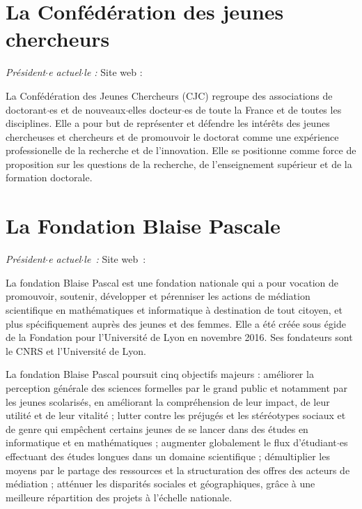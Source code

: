\section{La Conf\'ed\'eration des jeunes chercheurs}
\emph{Pr\'esident$\cdot$e actuel$\cdot$le : } \hfill Site web : 

\smallskip


La Conf\'ed\'eration des Jeunes Chercheurs (CJC) regroupe des associations
de doctorant$\cdot$es et de nouveaux$\cdot$elles docteur$\cdot$es de toute la France et de toutes
les disciplines. Elle a pour but de repr\'esenter et d\'efendre les int\'er\^ets
des jeunes chercheuses et chercheurs et de promouvoir le doctorat comme une exp\'erience
professionelle de la recherche et de l'innovation. Elle se positionne
comme force de proposition sur les questions de la recherche, de
l'enseignement sup\'erieur et de la formation doctorale.


\section{La Fondation Blaise Pascale}

\emph{Pr\'esident$\cdot$e actuel$\cdot$le~: } \hfill Site web~: 
\smallskip

La fondation Blaise Pascal est une fondation nationale qui a pour vocation de promouvoir, soutenir, d\'evelopper et p\'erenniser les actions de m\'ediation scientifique en math\'ematiques et informatique \`a destination de tout citoyen, et plus sp\'ecifiquement aupr\`es des jeunes et des femmes. Elle a \'et\'e cr\'e\'ee sous \'egide de la Fondation pour l’Universit\'e de Lyon en novembre 2016. Ses fondateurs sont le CNRS et l’Universit\'e de Lyon.
 
La fondation Blaise Pascal poursuit cinq objectifs majeurs :
am\'eliorer la perception g\'en\'erale des sciences formelles par le grand public et notamment par les jeunes scolaris\'es, en am\'eliorant la compr\'ehension de leur impact, de leur utilit\'e et de leur vitalit\'e ; lutter contre les pr\'ejug\'es et les st\'er\'eotypes sociaux et de genre qui empêchent certains jeunes de se lancer dans des \'etudes en informatique et en math\'ematiques ; augmenter globalement le flux d'\'etudiant$\cdot$es effectuant des \'etudes longues dans un domaine scientifique ;
d\'emultiplier les moyens par le partage des ressources et la structuration des offres des acteurs de m\'ediation ; att\'enuer les disparit\'es sociales et g\'eographiques, grâce \`a une meilleure r\'epartition des projets \`a l'\'echelle nationale.


